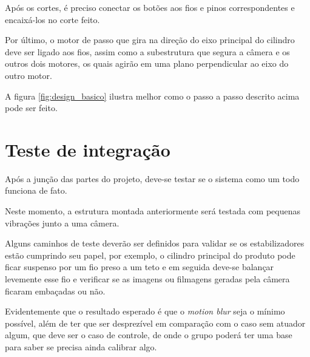 Após os cortes, é preciso conectar os botões aos fios e pinos correspondentes e encaixá-los no corte feito.

Por último, o motor de passo que gira na direção do eixo principal do cilindro deve ser ligado aos fios, assim como a subestrutura que segura a câmera e os outros dois motores, os quais agirão em uma plano perpendicular ao eixo do outro motor. 

A figura \ref{fig:design_basico} ilustra melhor como o passo a passo descrito acima pode ser feito. 


\section{Teste de integração}
Após a junção das partes do projeto, deve-se testar se o sistema como um todo funciona de fato.

Neste momento, a estrutura montada anteriormente será testada com pequenas vibrações junto a uma câmera. 

Alguns caminhos de teste deverão ser definidos para validar se os estabilizadores estão cumprindo seu papel, por exemplo, o cilindro principal do produto pode ficar suspenso por um fio preso a um teto e em seguida deve-se balançar levemente esse fio e verificar se as imagens ou filmagens geradas pela câmera ficaram embaçadas ou não.

Evidentemente que o resultado esperado é que o \textit{motion blur} seja o mínimo possível, além de ter que ser desprezível em comparação com o caso sem atuador algum, que deve ser o caso de controle, de onde o grupo poderá ter uma base para saber se precisa ainda calibrar algo.
